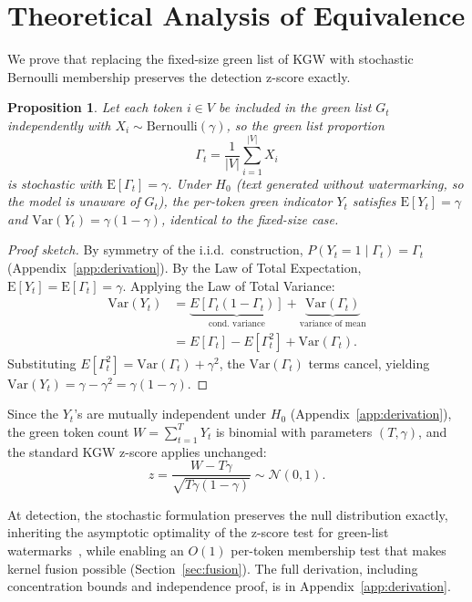 \documentclass[11pt]{article}
\newtheorem{proposition}{Proposition}
\begin{document}
\section{Theoretical Analysis of Equivalence}
\label{sec:theory}

We prove that replacing the fixed-size green list of KGW with stochastic Bernoulli membership preserves the detection z-score exactly.

\begin{proposition}
Let each token $i \in V$ be included in the green list $G_t$ independently with $X_i \sim \mathrm{Bernoulli}(\gamma)$, so the green list proportion
\begin{equation}
\Gamma_t = \frac{1}{|V|}\sum_{i=1}^{|V|} X_i
\end{equation}
is stochastic with $\mathrm{E}[\Gamma_t] = \gamma$. Under $H_0$ (text generated without watermarking, so the model is unaware of $G_t$), the per-token green indicator $Y_t$ satisfies $\mathrm{E}[Y_t] = \gamma$ and $\mathrm{Var}(Y_t) = \gamma(1-\gamma)$, identical to the fixed-size case.
\end{proposition}

\begin{proof}[Proof sketch]
By symmetry of the i.i.d.\ construction, $P(Y_t = 1 \mid \Gamma_t) = \Gamma_t$ (Appendix~\ref{app:derivation}). By the Law of Total Expectation, $\mathrm{E}[Y_t] = \mathrm{E}[\Gamma_t] = \gamma$. Applying the Law of Total Variance:
\begin{align}
\mathrm{Var}(Y_t)
  &= \underbrace{E[\Gamma_t(1{-}\Gamma_t)]}_{\text{cond.\ variance}}
  + \underbrace{\mathrm{Var}(\Gamma_t)}_{\text{variance of mean}} \nonumber\\
  &= E[\Gamma_t] - E[\Gamma_t^2] + \mathrm{Var}(\Gamma_t).
\end{align}
Substituting $E[\Gamma_t^2] = \mathrm{Var}(\Gamma_t) + \gamma^2$, the $\mathrm{Var}(\Gamma_t)$ terms cancel, yielding $\mathrm{Var}(Y_t) = \gamma - \gamma^2 = \gamma(1-\gamma)$.
\end{proof}

Since the $Y_t$'s are mutually independent under $H_0$ (Appendix~\ref{app:derivation}), the green token count $W = \sum_{t=1}^T Y_t$ is binomial with parameters $(T, \gamma)$, and the standard KGW z-score applies unchanged:
\begin{equation}
z = \frac{W - T\gamma}{\sqrt{T\gamma(1-\gamma)}} \sim \mathcal{N}(0,1).
\end{equation}

At detection, the stochastic formulation preserves the null distribution exactly, inheriting the asymptotic optimality of the z-score test for green-list watermarks~\cite{li2025statistical}, while enabling an $O(1)$ per-token membership test that makes kernel fusion possible (Section~\ref{sec:fusion}). The full derivation, including concentration bounds and independence proof, is in Appendix~\ref{app:derivation}.
\end{document}
